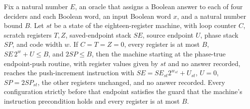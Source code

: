 \begin{theorem}
\label{Complexity.LogProg.SavitchARM.pushU_run}
\leanok
{}
Fix a natural number $E$, an oracle that assigns a Boolean answer to each of four
deciders and each Boolean word, an input Boolean word $x$, and a natural number bound
$B$. Let $st$ be a state of the eighteen-register machine, with loop counter $C$,
scratch registers $T,Z$, saved-endpoint stack $SE$, source endpoint $U$, phase stack
$SP$, and code width $w$. If $C=T=Z=0$, every register is at most $B$, $SE\,2^w+U\le B$,
and $2SP\le B$, then the machine starting at the phase-true endpoint-push routine, with
register values given by $st$ and no answer recorded, reaches the push-increment
instruction with $SE=SE_{st}2^{w_{st}}+U_{st}$, $U=0$, $SP=2SP_{st}$, the other
registers unchanged, and no answer recorded. Every configuration strictly before that
endpoint satisfies the guard that the machine’s instruction precondition holds and every
register is at most $B$.
\end{theorem}

